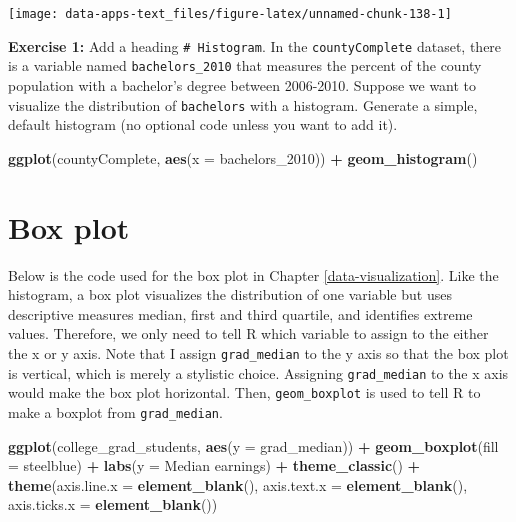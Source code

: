 \documentclass[
]{book}
\makeatletter
\newenvironment{Shaded}{\begin{snugshade}}{\end{snugshade}}
\newcommand{\AttributeTok}[1]{\textcolor[rgb]{0.27,0.27,0.27}{#1}}
\newcommand{\FunctionTok}[1]{\textcolor[rgb]{0.27,0.27,0.27}{\textbf{#1}}}
\newcommand{\NormalTok}[1]{#1}
\newcommand{\SpecialCharTok}[1]{\textcolor[rgb]{0.43,0.43,0.43}{\textbf{#1}}}
\newcommand{\StringTok}[1]{\textcolor[rgb]{0.5,0.5,0.5}{#1}}
\newenvironment{kframe}{%
\medskip{}
\setlength{\fboxsep}{.8em}
 \def\at@end@of@kframe{}%
 \ifinner\ifhmode%
  \def\at@end@of@kframe{\end{minipage}}%
  \begin{minipage}{\columnwidth}%
 \fi\fi%
 \def\FrameCommand##1{\hskip\@totalleftmargin \hskip-\fboxsep
 \colorbox{shadecolor}{##1}\hskip-\fboxsep
     \hskip-\linewidth \hskip-\@totalleftmargin \hskip\columnwidth}%
 \MakeFramed {\advance\hsize-\width
   \@totalleftmargin\z@ \linewidth\hsize
   \@setminipage}}%
 {\par\unskip\endMakeFramed%
 \at@end@of@kframe}
\renewenvironment{Shaded}{\begin{kframe}}{\end{kframe}}
\newenvironment{rmdblock}[1]
  {\begin{shaded*}
  }
  {\end{shaded*}
  }
\newenvironment{learncheck}
  {\begin{rmdblock}{warning}}
  {\end{rmdblock}}
\makeatother
\begin{document}
\begin{center}\texttt{[image: data-apps-text\_files/figure-latex/unnamed-chunk-138-1]} \end{center}

\begin{learncheck}
\textbf{Exercise 1:} Add a heading \texttt{\#\ Histogram}. In the
\texttt{countyComplete} dataset, there is a variable named
\texttt{bachelors\_2010} that measures the percent of the county
population with a bachelor's degree between 2006-2010. Suppose we want
to visualize the distribution of \texttt{bachelors} with a histogram.
Generate a simple, default histogram (no optional code unless you want
to add it).
\end{learncheck}

\begin{Shaded}
\begin{Highlighting}[]
\FunctionTok{ggplot}\NormalTok{(countyComplete, }\FunctionTok{aes}\NormalTok{(}\AttributeTok{x =}\NormalTok{ bachelors\_2010)) }\SpecialCharTok{+}
  \FunctionTok{geom\_histogram}\NormalTok{()}
\end{Highlighting}
\end{Shaded}

\hypertarget{box-plot-1}{%
\section{Box plot}\label{box-plot-1}}

Below is the code used for the box plot in Chapter \ref{data-visualization}. Like the histogram, a box plot visualizes the distribution of one variable but uses descriptive measures median, first and third quartile, and identifies extreme values. Therefore, we only need to tell R which variable to assign to the either the x or y axis. Note that I assign \texttt{grad\_median} to the y axis so that the box plot is vertical, which is merely a stylistic choice. Assigning \texttt{grad\_median} to the x axis would make the box plot horizontal. Then, \texttt{geom\_boxplot} is used to tell R to make a boxplot from \texttt{grad\_median}.

\begin{Shaded}
\begin{Highlighting}[]
\FunctionTok{ggplot}\NormalTok{(college\_grad\_students, }\FunctionTok{aes}\NormalTok{(}\AttributeTok{y =}\NormalTok{ grad\_median)) }\SpecialCharTok{+}
  \FunctionTok{geom\_boxplot}\NormalTok{(}\AttributeTok{fill =} \StringTok{\textquotesingle{}steelblue\textquotesingle{}}\NormalTok{) }\SpecialCharTok{+}
  \FunctionTok{labs}\NormalTok{(}\AttributeTok{y =} \StringTok{\textquotesingle{}Median earnings\textquotesingle{}}\NormalTok{) }\SpecialCharTok{+}
  \FunctionTok{theme\_classic}\NormalTok{() }\SpecialCharTok{+}
  \FunctionTok{theme}\NormalTok{(}\AttributeTok{axis.line.x =} \FunctionTok{element\_blank}\NormalTok{(),}
        \AttributeTok{axis.text.x =} \FunctionTok{element\_blank}\NormalTok{(),}
        \AttributeTok{axis.ticks.x =} \FunctionTok{element\_blank}\NormalTok{())}
\end{Highlighting}
\end{Shaded}
\end{document}
